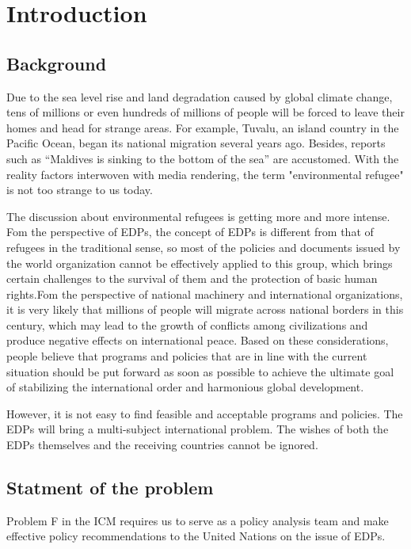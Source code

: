\documentclass{mcmthesis}
\begin{document}
\section{Introduction}
\subsection{Background}

Due to the sea level rise and land degradation caused by global climate change, tens of millions or even hundreds of millions of people will be forced to leave their homes and head for strange areas. For example, Tuvalu, an island country in the Pacific Ocean, began its national migration several years ago. Besides, reports such as “Maldives is sinking to the bottom of the sea” are accustomed. With the reality factors interwoven with media rendering, the term "environmental refugee" is not too strange to us today.

The discussion about environmental refugees is getting more and more intense. Fom the perspective of EDPs, the concept of EDPs is different from that of refugees in the traditional sense, so most of the policies and documents issued by the world organization cannot be effectively applied to this group, which brings certain challenges to the survival of them and the protection of basic human rights.Fom the perspective of national machinery and international organizations, it is very likely that millions of people will migrate across national borders in this century, which may lead to the growth of conflicts among civilizations and produce negative effects on international peace. Based on these considerations, people believe that programs and policies that are in line with the current situation should be put forward as soon as possible to achieve the ultimate goal of stabilizing the international order and harmonious global development.

However, it is not easy to find feasible and acceptable programs and policies. The EDPs will bring a multi-subject international problem. The wishes of both the EDPs themselves and the receiving countries cannot be ignored. 

\subsection{Statment of the problem}
Problem F in the ICM requires us to serve as a policy analysis team and make effective policy recommendations to the United Nations on the issue of EDPs. 
\end{document}

